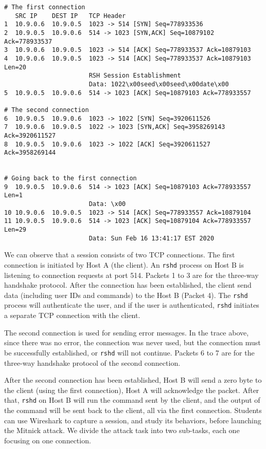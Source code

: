 \begin{lstlisting}[caption={Packet trace of a \rsh session},
                  label={listing:rsh}]
# The first connection
   SRC IP    DEST IP   TCP Header
1  10.9.0.6  10.9.0.5  1023 -> 514 [SYN] Seq=778933536 
2  10.9.0.5  10.9.0.6  514 -> 1023 [SYN,ACK] Seq=10879102 Ack=778933537 
3  10.9.0.6  10.9.0.5  1023 -> 514 [ACK] Seq=778933537 Ack=10879103 
4  10.9.0.6  10.9.0.5  1023 -> 514 [ACK] Seq=778933537 Ack=10879103 Len=20
                       RSH Session Establishment
                       Data: 1022\x00seed\x00seed\x00date\x00
5  10.9.0.5  10.9.0.6  514 -> 1023 [ACK] Seq=10879103 Ack=778933557

# The second connection
6  10.9.0.5  10.9.0.6  1023 -> 1022 [SYN] Seq=3920611526 
7  10.9.0.6  10.9.0.5  1022 -> 1023 [SYN,ACK] Seq=3958269143 Ack=3920611527 
8  10.9.0.5  10.9.0.6  1023 -> 1022 [ACK] Seq=3920611527 Ack=3958269144 


# Going back to the first connection
9  10.9.0.5  10.9.0.6  514 -> 1023 [ACK] Seq=10879103 Ack=778933557 Len=1
                       Data: \x00
10 10.9.0.6  10.9.0.5  1023 -> 514 [ACK] Seq=778933557 Ack=10879104 
11 10.9.0.5  10.9.0.6  514 -> 1023 [ACK] Seq=10879104 Ack=778933557 Len=29
                       Data: Sun Feb 16 13:41:17 EST 2020
\end{lstlisting}


We can observe that a \rsh session consists of two TCP connections.  
The first connection is initiated by Host A (the client). 
An \texttt{rshd} process on Host B is listening to connection requests at port 514. 
Packets 1 to 3 are for the three-way handshake protocol. 
After the connection has been established, the client 
send \rsh data (including user IDs and commands) to the Host B (Packet 4).
The \texttt{rshd} process will authenticate the user, and 
if the user is authenticated, \texttt{rshd} initiates a
separate TCP connection with the client. 


The second connection is used for sending error messages. 
In the trace above, since there was no error, the connection was never used, 
but the connection must be successfully established, or \texttt{rshd} 
will not continue. Packets 6 to 7 are for the three-way handshake protocol
of the second connection. 


After the second connection has been established, 
Host B will send a zero byte to the client (using the first connection),
Host A will acknowledge the packet. After that, \texttt{rshd} on Host B
will run the command sent by the client, and the
output of the command will be sent back to the client, all via the 
first connection. 
Students can use Wireshark to capture a \rsh session, and study its
behaviors, before launching the Mitnick attack. 
We divide the attack task into two sub-tasks, each one focusing on one connection. 



